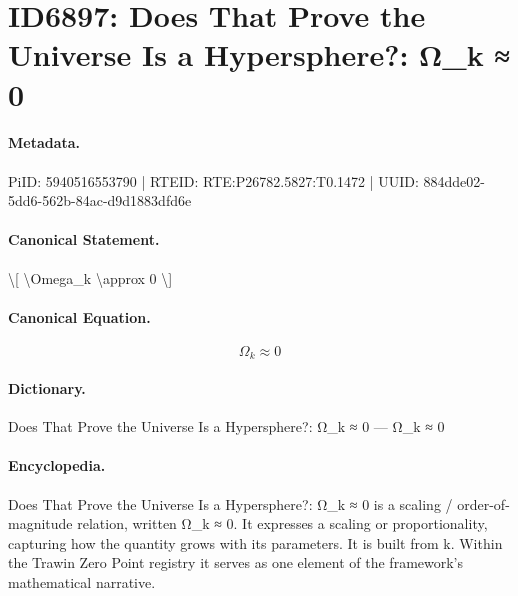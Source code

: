 \section*{ID6897: Does That Prove the Universe Is a Hypersphere?: Ω\_k ≈ 0}
\paragraph{Metadata.}
PiID: 5940516553790 | RTEID: RTE:P26782.5827:T0.1472 | UUID: 884dde02-5dd6-562b-84ac-d9d1883dfd6e

\paragraph{Canonical Statement.}
\textbackslash{}[ \textbackslash{}Omega\_k \textbackslash{}approx 0 \textbackslash{}]

\paragraph{Canonical Equation.}
\[
\Omega_k \approx 0
\]

\paragraph{Dictionary.}
Does That Prove the Universe Is a Hypersphere?: Ω\_k ≈ 0 — Ω\_k ≈ 0

\paragraph{Encyclopedia.}
Does That Prove the Universe Is a Hypersphere?: Ω\_k ≈ 0 is a scaling / order-of-magnitude relation, written Ω\_k ≈ 0. It expresses a scaling or proportionality, capturing how the quantity grows with its parameters. It is built from k. Within the Trawin Zero Point registry it serves as one element of the framework's mathematical narrative.
